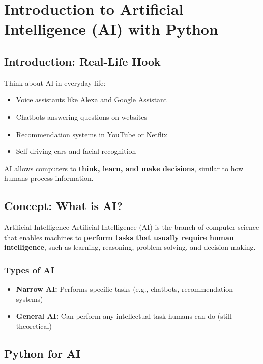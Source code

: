 \chapter{Introduction to Artificial Intelligence (AI) with Python}

\section{Introduction: Real-Life Hook}

Think about AI in everyday life:

\begin{itemize}
    \item Voice assistants like Alexa and Google Assistant  
    \item Chatbots answering questions on websites  
    \item Recommendation systems in YouTube or Netflix  
    \item Self-driving cars and facial recognition  
\end{itemize}

AI allows computers to \textbf{think, learn, and make decisions}, similar to how humans process information.

\section{Concept: What is AI?}

\begin{definition}{Artificial Intelligence}
Artificial Intelligence (AI) is the branch of computer science that enables machines to \textbf{perform tasks that usually require human intelligence}, such as learning, reasoning, problem-solving, and decision-making.
\end{definition}

\subsection{Types of AI}

\begin{itemize}
    \item \textbf{Narrow AI:} Performs specific tasks (e.g., chatbots, recommendation systems)  
    \item \textbf{General AI:} Can perform any intellectual task humans can do (still theoretical)  
\end{itemize}

\section{Python for AI}

